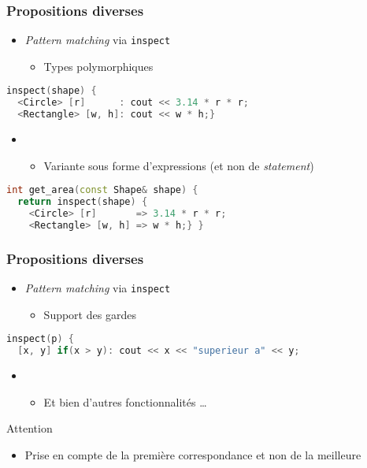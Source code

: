 \documentclass[C++.tex]{subfiles}
\begin{document}
\begin{frame}[fragile]
	\frametitle{Propositions diverses}
	\begin{itemize}
		\item \textit{Pattern matching} via \lstinline|inspect|
		\begin{itemize}
			\item Types polymorphiques
		\end{itemize}
	\end{itemize}

	\begin{lstlisting}[language=C++]
inspect(shape) {
  <Circle> [r]      : cout << 3.14 * r * r;
  <Rectangle> [w, h]: cout << w * h;}\end{lstlisting}

	\begin{itemize}
		\item [] \begin{itemize}
			\item Variante sous forme d'expressions (et non de \textit{statement})
		\end{itemize}
	\end{itemize}

	\begin{lstlisting}[language=C++]
int get_area(const Shape& shape) {
  return inspect(shape) {
    <Circle> [r]       => 3.14 * r * r;
    <Rectangle> [w, h] => w * h;} }\end{lstlisting}
\end{frame}

\begin{frame}[fragile]
	\frametitle{Propositions diverses}
	\begin{itemize}
		\item \textit{Pattern matching} via \lstinline|inspect|
		\begin{itemize}
			\item Support des gardes
		\end{itemize}
	\end{itemize}

	\begin{lstlisting}[language=C++]
inspect(p) {
  [x, y] if(x > y): cout << x << "superieur a" << y;\end{lstlisting}

	\begin{itemize}
		\item [] \begin{itemize}
			\item Et bien d'autres fonctionnalités \ldots
		\end{itemize}
	\end{itemize}

	\begin{alertblock}{Attention}
		\begin{itemize}
			\item Prise en compte de la première correspondance et non de la meilleure
		\end{itemize}

	\end{alertblock}
\end{frame}
\end{document}
